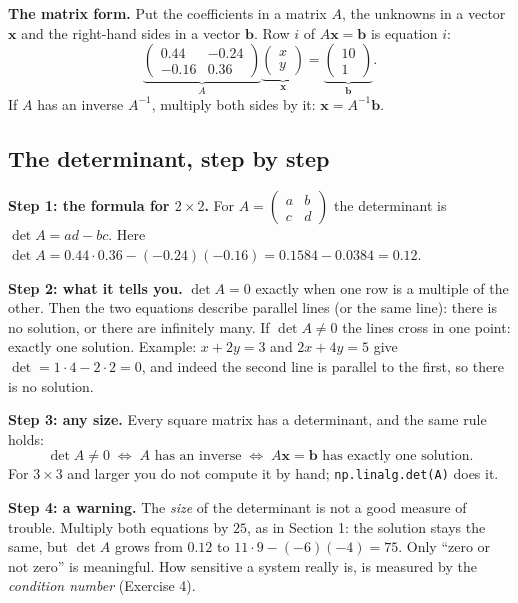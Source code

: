 \documentclass[11pt,a4paper]{article}
\begin{document}
\textbf{The matrix form.} Put the coefficients in a matrix $A$, the unknowns in a vector $\mathbf x$ and the right-hand
sides in a vector $\mathbf b$. Row $i$ of $A\mathbf x = \mathbf b$ is equation $i$:
\[
\underbrace{\begin{pmatrix} 0.44 & -0.24\\ -0.16 & 0.36 \end{pmatrix}}_{A}
\underbrace{\begin{pmatrix} x\\ y \end{pmatrix}}_{\mathbf x}
=
\underbrace{\begin{pmatrix} 10\\ 1 \end{pmatrix}}_{\mathbf b}.
\]
If $A$ has an inverse $A^{-1}$, multiply both sides by it: $\mathbf x = A^{-1}\mathbf b$.

\subsection*{The determinant, step by step}

\textbf{Step 1: the formula for $2 \times 2$.} For $A = \begin{pmatrix} a & b\\ c & d \end{pmatrix}$ the determinant is
$\det A = ad - bc$. Here $\det A = 0.44 \cdot 0.36 - (-0.24)(-0.16) = 0.1584 - 0.0384 = 0.12$.

\textbf{Step 2: what it tells you.} $\det A = 0$ exactly when one row is a multiple of the other. Then the two
equations describe parallel lines (or the same line): there is no solution, or there are infinitely many.
If $\det A \neq 0$ the lines cross in one point: exactly one solution.
Example: $x + 2y = 3$ and $2x + 4y = 5$ give $\det = 1 \cdot 4 - 2 \cdot 2 = 0$, and indeed the second line is parallel to
the first, so there is no solution.

\textbf{Step 3: any size.} Every square matrix has a determinant, and the same rule holds:
\[
\det A \neq 0 \;\Longleftrightarrow\; A \text{ has an inverse} \;\Longleftrightarrow\; A\mathbf x = \mathbf b \text{ has exactly one solution.}
\]
For $3 \times 3$ and larger you do not compute it by hand; \texttt{np.linalg.det(A)} does it.

\textbf{Step 4: a warning.} The \emph{size} of the determinant is not a good measure of trouble. Multiply both equations
by $25$, as in Section 1: the solution stays the same, but $\det A$ grows from $0.12$ to $11 \cdot 9 - (-6)(-4) = 75$.
Only ``zero or not zero'' is meaningful. How sensitive a system really is, is measured by the \emph{condition number}
(Exercise 4).
\end{document}
